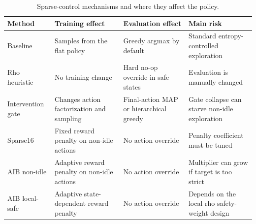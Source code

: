 \begin{table}[htbp]
  \centering
  \small
  \caption{Sparse-control mechanisms and where they affect the policy.}
  \label{tab:sparse-control-mechanisms}
  \setlength{\tabcolsep}{3pt}
  \begin{tabular}{L{0.18\textwidth}L{0.30\textwidth}L{0.24\textwidth}L{0.18\textwidth}}
    \toprule
    Method & Training effect & Evaluation effect & Main risk \\
    \midrule
    Baseline & Samples from the flat policy & Greedy argmax by default &
    Standard entropy-controlled exploration \\
    Rho heuristic & No training change & Hard no-op override in safe states &
    Evaluation is manually changed \\
    Intervention gate & Changes action factorization and sampling &
    Final-action MAP or hierarchical greedy & Gate collapse can starve non-idle exploration \\
    Sparse16 & Fixed reward penalty on non-idle actions & No action override &
    Penalty coefficient must be tuned \\
    AIB non-idle & Adaptive reward penalty on non-idle actions & No action override &
    Multiplier can grow if target is too strict \\
    AIB local-safe & Adaptive state-dependent reward penalty & No action override &
    Depends on the local rho safety-weight design \\
    \bottomrule
  \end{tabular}
\end{table}

